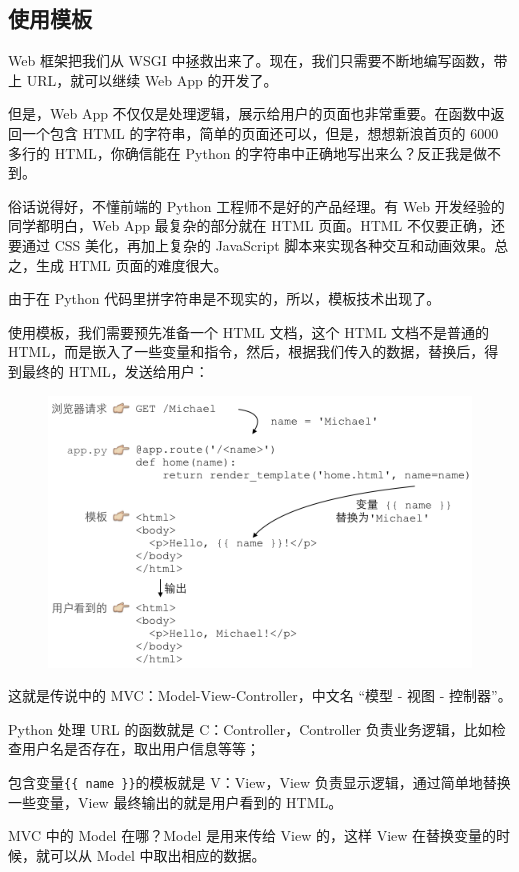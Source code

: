 \hypertarget{ux4f7fux7528ux6a21ux677f}{%
\subsection{使用模板}\label{ux4f7fux7528ux6a21ux677f}}

Web 框架把我们从 WSGI 中拯救出来了。现在，我们只需要不断地编写函数，带上
URL，就可以继续 Web App 的开发了。

但是，Web App
不仅仅是处理逻辑，展示给用户的页面也非常重要。在函数中返回一个包含 HTML
的字符串，简单的页面还可以，但是，想想新浪首页的 6000 多行的
HTML，你确信能在 Python 的字符串中正确地写出来么？反正我是做不到。

俗话说得好，不懂前端的 Python 工程师不是好的产品经理。有 Web
开发经验的同学都明白，Web App 最复杂的部分就在 HTML 页面。HTML
不仅要正确，还要通过 CSS 美化，再加上复杂的 JavaScript
脚本来实现各种交互和动画效果。总之，生成 HTML 页面的难度很大。

由于在 Python 代码里拼字符串是不现实的，所以，模板技术出现了。

使用模板，我们需要预先准备一个 HTML 文档，这个 HTML 文档不是普通的
HTML，而是嵌入了一些变量和指令，然后，根据我们传入的数据，替换后，得到最终的
HTML，发送给用户：

 
 \begin{figure}[htp]
	\centering
	\includegraphics[width=0.6\linewidth]{fig/951383573211136.png}
\end{figure}


这就是传说中的 MVC：Model-View-Controller，中文名 ``模型 - 视图 -
控制器''。

Python 处理 URL 的函数就是 C：Controller，Controller
负责业务逻辑，比如检查用户名是否存在，取出用户信息等等；

包含变量\texttt{\{\{\ name\ \}\}}的模板就是 V：View，View
负责显示逻辑，通过简单地替换一些变量，View 最终输出的就是用户看到的
HTML。

MVC 中的 Model 在哪？Model 是用来传给 View 的，这样 View
在替换变量的时候，就可以从 Model 中取出相应的数据。


